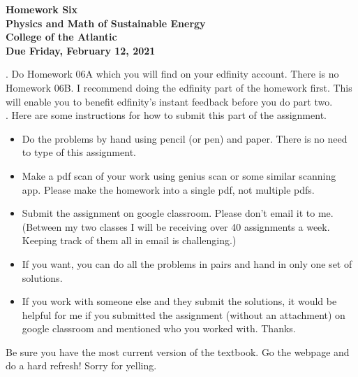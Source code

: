 \documentclass[12pt]{article}
\begin{document}
\pagestyle{empty}
 
\begin{center}
{\LARGE {\bf Homework Six}}\\
\bigskip
{\Large {\bf Physics and Math of Sustainable Energy}}\\
\bigskip
{\Large {\bf College of the Atlantic}}\\
\bigskip
{ {\bf Due Friday, February 12, 2021}}\\ 
\end{center}
\medskip



.  Do Homework 06A which you will find
on your edfinity account.  There is no Homework 06B.  I recommend
doing the edfinity part of the homework first.  This will enable you
to benefit edfinity's instant feedback before you do part two.\\ 


.
Here are some 
instructions for how to submit this part of the assignment.
\begin{itemize}
\setlength{\itemsep}{0mm}
\item Do the problems by hand using pencil (or pen) and paper.
  There is no need to type of this assignment.
\item Make a pdf scan of your work using genius scan or some
  similar scanning app.  Please make the homework into a single
  pdf, not multiple pdfs. 
\item Submit the assignment on google classroom.  Please don't
  email it to me.  (Between my two classes I will be receiving
  over 40 assignments a week.  Keeping track of them all in email
  is challenging.)
\item If you want, you can do all the problems in pairs and hand
  in only one set of solutions.
\item If you work with someone else and they submit the solutions, it
  would be helpful for me if you submitted the assignment (without an
  attachment) on google classroom and mentioned who you worked with.
  Thanks. 

\end{itemize}


  Be sure you have the most
current version of the textbook.  Go the webpage and do a hard
refresh!  Sorry for yelling.\\ 
\end{document}
